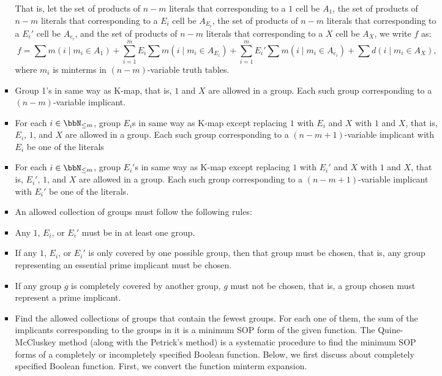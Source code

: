 \documentclass[a4paper,12pt]{article}
\begin{document}
\begin{itemize}
\begin{itemize}
\begin{itemize}
\begin{itemize}
\begin{itemize}
\begin{itemize}
\begin{itemize}
\eit
That is, let the set of products of $n-m$ literals that corresponding to a $1$ cell be $A_1$, the set of products of $n-m$ literals that corresponding to a $E_i$ cell be $A_{E_i}$, the set of products of $n-m$ literals that corresponding to a $E_i'$ cell be $A_{e_i}$, and the set of products of $n-m$ literals that corresponding to a $X$ cell be $A_X$, we write $f$ as:
\[f=\sum m(i\mid m_i\in A_1)+\sum_{i=1}^mE_i\sum m(i\mid m_i\in A_{E_i})+\sum_{i=1}^mE_i'\sum m(i\mid m_i\in A_{e_i})+\sum d(i\mid m_i\in A_X),\]
where $m_i$ is minterms in $(n-m)$-variable truth tables.
\item Group 1's in same way as K-map, that is, $1$ and $X$ are allowed in a group. Each such group corresponding to a $(n-m)$-variable implicant.
\item For each $i\in\bbN_{\leq m}$, group $E_i$s in same way as K-map except replacing $1$ with $E_i$ and $X$ with $1$ and $X$, that is, $E_i$, $1$, and $X$ are allowed in a group. Each such group corresponding to a $(n-m+1)$-variable implicant with $E_i$ be one of the literals
\item For each $i\in\bbN_{\leq m}$, group $E_i'$s in same way as K-map except replacing $1$ with $E_i'$ and $X$ with $1$ and $X$, that is, $E_i'$, $1$, and $X$ are allowed in a group. Each such group corresponding to a $(n-m+1)$-variable implicant with $E_i'$ be one of the literals.
\item An allowed collection of groups must follow the following rules:
\bit
\item Any $1$, $E_i$, or $E_i'$ must be in at least one group.
\item If any $1$, $E_i$, or $E_i'$ is only covered by one possible group, then that group must be chosen, that is, any group representing an essential prime implicant must be chosen.
\item If any group $g$ is completely covered by another group, $g$ must not be chosen, that is, a group chosen must represent a prime implicant.
\eit
\item Find the allowed collections of groups that contain the fewest groups. For each one of them, the sum of the implicants corresponding to the groups in it is a minimum SOP form of the given function.
\een
{}
The Quine-McCluskey method (along with the Petrick's method) is a systematic procedure to find the minimum SOP forms of a completely or incompletely specified Boolean function. Below, we first discuss about completely specified Boolean function.
First, we convert the function minterm expansion.


\end{itemize}
\end{itemize}
\end{itemize}
\end{itemize}
\end{itemize}
\end{itemize}
\end{itemize}
\end{document}
